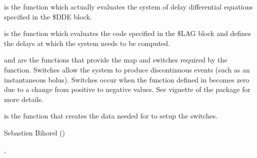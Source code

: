 %
\begin{Details}\relax
{} is the function which actually evaluates the system of delay
differential equations specified in the \$DDE block.

 is the function which evaluates the code specified in the \$LAG 
block and defines the delays at which the system needs to be computed.

 and  are the functions that provide the map 
and switches required by the  function. Switches allow the system to
produce discontinuous events (such as an instantaneous bolus). Switches occur
when the function defined in  becomes zero due to a change 
from positive to negative values. See vignette of the  
package for more details.

 is the function that creates the data needed for 
 to setup the switches.
\end{Details}
%
\begin{Author}\relax
Sebastien Bihorel ()
\end{Author}
%
\begin{SeeAlso}\relax
{}, 
\end{SeeAlso}
